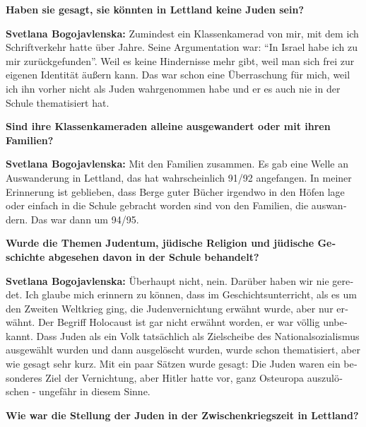 \begin{otherlanguage}{ngerman}
\textbf{Haben sie gesagt, sie könnten in Lettland keine Juden sein?}

\textbf{Svetlana Bogojavlenska:} Zumindest ein Klassenkamerad von mir, mit dem ich Schriftverkehr hatte über Jahre. Seine Argumentation war: "`In Israel habe ich zu mir zurückgefunden"'. Weil es keine Hindernisse mehr gibt, weil man sich frei zur eigenen Identität äußern kann. Das war schon eine Überraschung für mich, weil ich ihn vorher nicht als Juden wahrgenommen habe und er es auch nie in der Schule thematisiert hat.

\textbf{Sind ihre Klassenkameraden alleine ausgewandert oder mit ihren Familien?}

\textbf{Svetlana Bogojavlenska:} Mit den Familien zusammen. Es gab eine Welle an Auswanderung in Lettland, das hat wahrscheinlich 91/92 angefangen. In meiner Erinnerung ist geblieben, dass Berge guter Bücher irgendwo in den Höfen lage oder einfach in die Schule gebracht worden sind von den Familien, die auswandern. Das war dann um 94/95.

\textbf{Wurde die Themen Judentum, jüdische Religion und jüdische Geschichte abgesehen davon in der Schule behandelt?}

\textbf{Svetlana Bogojavlenska:} Überhaupt nicht, nein. Darüber haben wir nie geredet. Ich glaube mich erinnern zu können, dass im Geschichtsunterricht, als es um den Zweiten Weltkrieg ging, die Judenvernichtung erwähnt wurde, aber nur erwähnt. Der Begriff Holocaust ist gar nicht erwähnt worden, er war völlig unbekannt. Dass Juden als ein Volk tatsächlich als Zielscheibe des Nationalsozialismus ausgewählt wurden und dann ausgelöscht wurden, wurde schon thematisiert, aber wie gesagt sehr kurz. Mit ein paar Sätzen wurde gesagt: Die Juden waren ein besonderes Ziel der Vernichtung, aber Hitler hatte vor, ganz Osteuropa auszulöschen - ungefähr in diesem Sinne.

\textbf{Wie war die Stellung der Juden in der Zwischenkriegszeit in Lettland?}


\end{otherlanguage}
